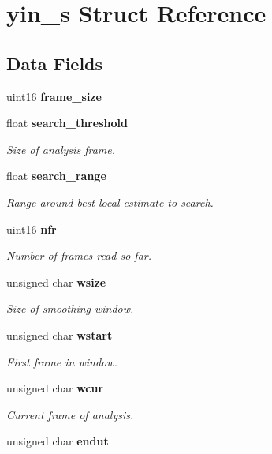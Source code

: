 \section{yin\+\_\+s Struct Reference}
\label{structyin__s}
\subsection*{Data Fields}
\begin{DoxyCompactItemize}
\item 
uint16 {\bfseries frame\+\_\+size}\label{structyin__s_a25a7e0400397ab1fcbf82f4d0568722a}

\item 
float {\bf search\+\_\+threshold}
\begin{DoxyCompactList}\small\item\em Size of analysis frame. \end{DoxyCompactList}\item 
float {\bf search\+\_\+range}\label{structyin__s_a6dd2dda40ad048fa8be8a21cf59ca77b}

\begin{DoxyCompactList}\small\item\em Range around best local estimate to search. \end{DoxyCompactList}\item 
uint16 {\bf nfr}
\begin{DoxyCompactList}\small\item\em Number of frames read so far. \end{DoxyCompactList}\item 
unsigned char {\bf wsize}
\begin{DoxyCompactList}\small\item\em Size of smoothing window. \end{DoxyCompactList}\item 
unsigned char {\bf wstart}
\begin{DoxyCompactList}\small\item\em First frame in window. \end{DoxyCompactList}\item 
unsigned char {\bf wcur}
\begin{DoxyCompactList}\small\item\em Current frame of analysis. \end{DoxyCompactList}\item 
unsigned char {\bf endut}\label{structyin__s_a61ca0fc8444a1bdde10aca37dc9f0f56}


\end{DoxyCompactItemize}
